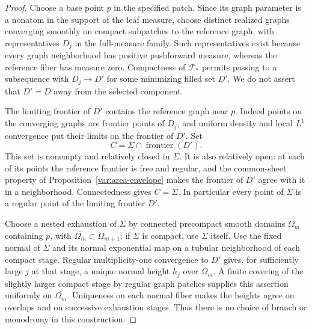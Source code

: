 \begin{proof}
Choose a base point $p$ in the specified patch.  Since its graph
parameter is a nonatom in the support of the leaf measure, choose
distinct realized graphs converging smoothly on compact subpatches
to the reference graph, with representatives $D_j$ in the full-measure
family.  Such representatives exist because every graph neighborhood
has positive pushforward measure, whereas the reference fiber has
measure zero.  Compactness of $\mathcal F_*$ permits passing to a
subsequence with $D_j\to D'$ for some minimizing filled set $D'$.
We do not assert that $D'=D$ away from the selected component.

The limiting frontier of $D'$ contains the reference graph near $p$.
Indeed points on the converging graphs are frontier points of $D_j$,
and uniform density and local $L^1$ convergence put their limits on
the frontier of $D'$.  Set
\[
 C=\Sigma\cap\operatorname{frontier}(D').
\]
This set is nonempty and relatively closed in $\Sigma$.  It is also
relatively open: at each of its points the reference frontier is free
and regular, and the common-sheet property of
Proposition~\ref{var:area-envelope} makes the frontier of $D'$ agree
with it in a neighborhood.  Connectedness gives $C=\Sigma$.
In particular every point of $\Sigma$ is a regular point of the
limiting frontier $D'$.

Choose a nested exhaustion of $\Sigma$ by connected precompact smooth
domains $\Omega_m$ containing $p$, with
$\overline{\Omega_m}\subset\Omega_{m+1}$; if $\Sigma$ is compact, use
$\Sigma$ itself.  Use the fixed normal of
$\Sigma$ and its normal exponential map on a tubular neighborhood
of each compact stage.  Regular multiplicity-one convergence to
$D'$ gives, for sufficiently large $j$ at that stage, a unique normal
height $h_j$ over $\Omega_m$.  A finite covering of the slightly
larger compact stage by regular graph patches supplies this assertion
uniformly on $\overline{\Omega_m}$.  Uniqueness on each normal fiber
makes the heights agree on overlaps and on successive exhaustion
stages.  Thus there is no choice of branch or monodromy in this
construction.


\end{proof}
